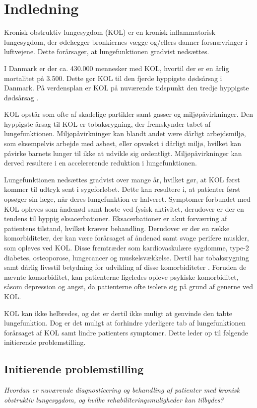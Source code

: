 \chapter{Indledning} 
Kronisk obstruktiv lungesygdom (KOL) er en kronisk inflammatorisk lungesygdom, der ødelægger bronkiernes vægge og/ellers danner forsnævringer i luftvejene. Dette forårsager, at lungefunktionen gradvist nedsættes.\cite{Basisbogen2016}

I Danmark er der ca. 430.000 mennesker med KOL, hvortil der er en årlig mortalitet på 3.500. Dette gør KOL til den fjerde hyppigste dødsårsag i Danmark.\cite{Basisbogen2016} På verdensplan er KOL på nuværende tidspunkt den tredje hyppigste dødsårsag \cite{WHO2017}.

KOL opstår som ofte af skadelige partikler samt gasser og miljøpåvirkninger. Den hyppigste årsag til KOL er tobaksrygning, der fremskynder tabet af lungefunktionen.\cite{Basisbogen2016,dsam2016,Martinez2016} Miljøpåvirkninger kan blandt andet være dårligt arbejdsmiljø, som eksempelvis arbejde med asbest, eller opvækst i dårligt miljø, hvilket kan påvirke barnets lunger til ikke at udvikle sig ordentligt. Miljøpåvirkninger kan derved resultere i en accelererende reduktion i lungefunktionen.\cite{Martinez2016}

Lungefunktionen nedsættes gradvist over mange år, hvilket gør, at KOL først kommer til udtryk sent i sygeforløbet. Dette kan resultere i, at patienter først opsøger sin læge, når deres lungefunktion er halveret.\cite{dsam2016} Symptomer forbundet med KOL opleves som åndenød samt hoste ved fysisk aktivitet, derudover er der en tendens til hyppig eksacerbationer. Eksacerbationer er akut forværring af patientens tilstand, hvilket kræver behandling.\cite{Basisbogen2016,dsam2016}
Derudover er der en række komorbiditeter, der kan være forårsaget af åndenød samt svage perifere muskler, som opleves ved KOL. Disse fremtræder som kardiovaskulære sygdomme, type-2 diabetes, osteoporose, lungecancer og muskelsvækkelse.\cite{dsam2016} Dertil har tobaksrygning samt dårlig livsstil betydning for udvikling af disse komorbiditeter \cite{McCarthy2015}. Foruden de nævnte komorbiditet, kan patienterne ligeledes opleve psykiske komorbiditet, såsom depression og angst, da patienterne ofte isolere sig på grund af generne ved KOL.\cite{dsam2016}

KOL kan ikke helbredes, og det er dertil ikke muligt at genvinde den tabte lungefunktion. Dog er det muligt at forhindre yderligere tab af lungefunktionen forårsaget af KOL samt lindre patienters symptomer.\cite{Basisbogen2016} Dette leder op til følgende initierende problemstilling.


\section{Initierende problemstilling}
\textit{Hvordan er nuværende diagnosticering og behandling af patienter med kronisk obstruktiv lungesygdom, og hvilke rehabiliteringsmuligheder kan tilbydes?}